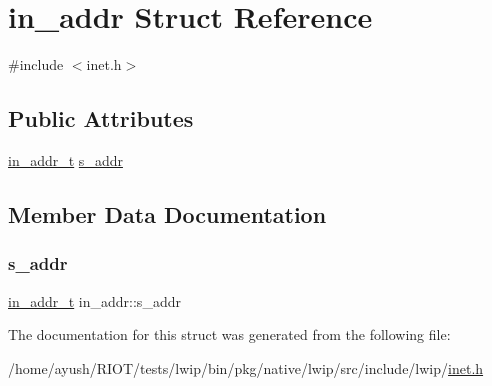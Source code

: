 \hypertarget{structin__addr}{}\section{in\+\_\+addr Struct Reference}
\label{structin__addr}


{\ttfamily \#include $<$inet.\+h$>$}

\subsection*{Public Attributes}
\begin{DoxyCompactItemize}
\item 
\hyperlink{native_2lwip_2src_2include_2lwip_2inet_8h_ab4fa3cac7cd90edc5ceb4efca7ec0059}{in\+\_\+addr\+\_\+t} \hyperlink{structin__addr_a3b6ef12385f913cc23a199205d9bf858}{s\+\_\+addr}
\end{DoxyCompactItemize}


\subsection{Member Data Documentation}
\mbox{\label{structin__addr_a3b6ef12385f913cc23a199205d9bf858}} 
\subsubsection{\texorpdfstring{s\+\_\+addr}{s\_addr}}
{\footnotesize\ttfamily \hyperlink{native_2lwip_2src_2include_2lwip_2inet_8h_ab4fa3cac7cd90edc5ceb4efca7ec0059}{in\+\_\+addr\+\_\+t} in\+\_\+addr\+::s\+\_\+addr}



The documentation for this struct was generated from the following file\+:\begin{DoxyCompactItemize}
\item 
/home/ayush/\+R\+I\+O\+T/tests/lwip/bin/pkg/native/lwip/src/include/lwip/\hyperlink{native_2lwip_2src_2include_2lwip_2inet_8h}{inet.\+h}\end{DoxyCompactItemize}
